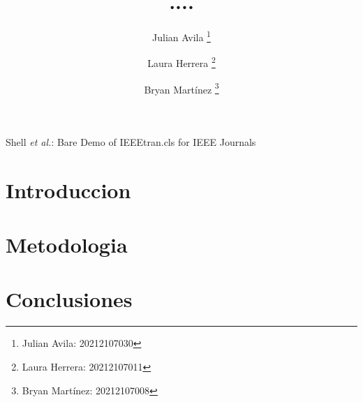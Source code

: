\documentclass[journal, table]{IEEEtran}
\begin{document}
\title{....}

\author[*]{Julian Avila
  \thanks{Julian Avila: 20212107030}}
\author[*]{Laura Herrera
  \thanks{Laura Herrera: 20212107011}}
\author[*]{Bryan Martínez
  \thanks{Bryan Martínez: 20212107008}}


\markboth{}
{Shell \MakeLowercase{\textit{et al.}}: Bare Demo of IEEEtran.cls for IEEE Journals}

\maketitle

\section{Introduccion}


\section{Metodologia}



\section{Conclusiones}


\printbibliography
\end{document}
